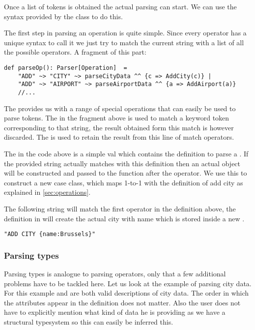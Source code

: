 Once a list of tokens is obtained the actual parsing can start. We can use the
syntax provided by the  class to do this.

\par
The first step in parsing an operation is quite simple. Since every operator
has a unique syntax to call it we just try to match the current string with
a list of all the possible operators. A fragment of this part:

\begin{lstlisting}
def parseOp(): Parser[Operation]  =
    "ADD" ~> "CITY" ~> parseCityData ^^ {c => AddCity(c)} |
    "ADD" ~> "AIRPORT" ~> parseAirportData ^^ {a => AddAirport(a)}
    //...
\end{lstlisting}

\par
The  provides us with a range of special operations
that can easily be used to parse tokens. The \sn{\textasciitilde>} in the
fragment above is used to match a keyword token corresponding to that string,
the result obtained form this match is however discarded. The
\sn{\textasciicircum\textasciicircum} is used to retain the result from this
line of match operators. 

\par
The  in the code above is a simple val which contains the
definition to parse a . If the provided string actually
matches with this definition then an actual  object will be
constructed and passed to the function after the \sn{\textasciicircum\textasciicircum}
operator. We use this to construct a new  case class, which
maps 1-to-1 with the definition of add city as explained in
\ref{sec:operations}.

\par
The following string will match the first operator in the definition above, the
definition in  will create the actual city with name
 which is stored inside a new .

\begin{lstlisting}
"ADD CITY {name:Brussels}"
\end{lstlisting}


\subsubsection{Parsing types}

Parsing types is analogue to parsing operators, only that a few additional
problems have to be tackled here. Let us look at the example of parsing city
data. For this example  and  are both valid descriptions of city data. The order in which
the attributes appear in the definition does not matter. Also the user does not
have to explicitly mention what kind of data he is providing as we have a
structural typesystem so this can easily be inferred this.


